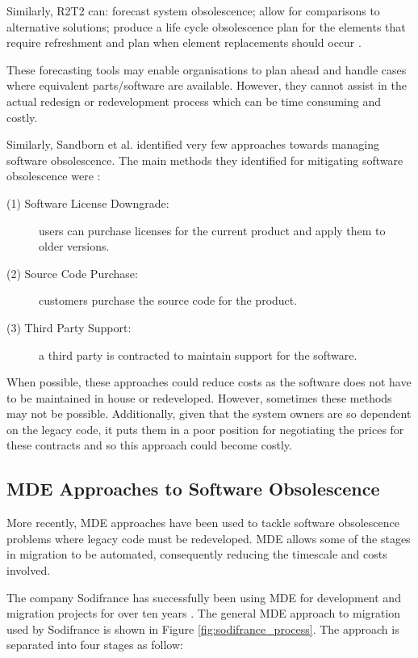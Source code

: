 \documentclass{UoYCSproject}
\begin{document}
Similarly, R2T2 can: forecast system obsolescence; allow for comparisons to alternative solutions; produce a life cycle obsolescence plan for the elements that require refreshment and plan when element replacements should occur \parencite{herald2009obsolescence}.

These forecasting tools may enable organisations to plan ahead and handle cases where equivalent parts/software are available. However, they cannot assist in the actual redesign or redevelopment process which can be time consuming and costly.

Similarly, Sandborn et al. identified very few approaches towards managing software obsolescence. The main methods they identified for mitigating software obsolescence were \parencite{sandborn2007obsolescence}:
\begin{description}
\item[(1) Software License Downgrade:] users can purchase licenses for the current product and apply them to older versions.
\item[(2) Source Code Purchase:] customers purchase the source code for the product.
\item[(3) Third Party Support:] a third party is contracted to maintain support for the software.
\end{description}
When possible, these approaches could reduce costs as the software does not have to be maintained in house or redeveloped. However, sometimes these methods may not be possible. Additionally, given that the system owners are so dependent on the legacy code, it puts them in a poor position for negotiating the prices for these contracts and so this approach could become costly.

\subsection{MDE Approaches to Software Obsolescence} \label{mde_approaches}
More recently, MDE approaches have been used to tackle software obsolescence problems where legacy code must be redeveloped. MDE allows some of the stages in migration to be automated, consequently reducing the timescale and costs involved.

The company Sodifrance has successfully been using MDE for development and migration projects for over ten years \parencite{fleurey2007model}. The general MDE approach to migration used by Sodifrance is shown in Figure \ref{fig:sodifrance_process}. The approach is separated into four stages as follow:
\end{document}
